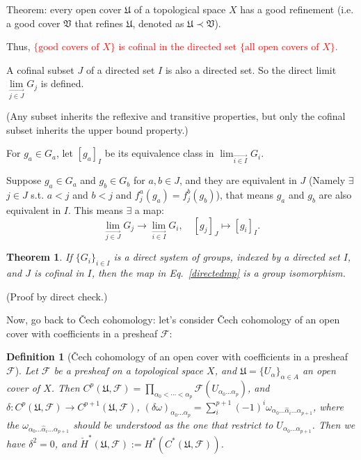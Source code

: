 \documentclass{article}
\theoremstyle{mystyle}
\newtheorem*{definition}{Definition}%
\newtheorem*{theorem*}{Theorem}
\theoremstyle{remark}
\numberwithin{equation}{section}
\begin{document}
Theorem: every open cover $\mathfrak{U}$ of a topological space $X$ has a good refinement (i.e. a good cover $\mathfrak{V}$ that refines $\mathfrak{U}$, denoted as $\mathfrak{U}\prec \mathfrak{V}$).

Thus, \textcolor{red}{$\{\text{good covers of }X\}$ is cofinal in the directed set $\{\text{all open covers of }X\}$.}

A cofinal subset $J$ of a directed set $I$ is also a directed set. So the direct limit $\lim\limits_{\stackrel{\longrightarrow}{j\in J}} G_j$ is defined.

(Any subset inherits the reflexive and transitive properties, but only the cofinal subset inherits the upper bound property.)

For $g_a \in G_a$, let $[g_a]_I$ be its equivalence class in $\lim_{\stackrel{\longrightarrow}{i\in I}} G_i$.

Suppose $g_a \in G_a$ and $g_b \in G_b$ for $a,b\in J$, and they are equivalent in $J$ (Namely $\exists$ $j \in J$ s.t. $a<j$ and $b<j$ and $f^a_j(g_a)=f^b_j(g_b)$), that means $g_a$ and $g_b$ are also equivalent in $I$. This means $\exists$ a map:  
\begin{equation}\label{directedmp}
\lim_{\stackrel{\longrightarrow}{j\in J}} G_j\rightarrow \lim_{\stackrel{\longrightarrow}{i\in I}} G_i,\quad  [g_j]_J\mapsto [g_i]_I.
\end{equation}

\begin{theorem*} If $\{G_i\}_{i\in I}$ is a direct system of groups, indexed by a directed set $I$, and $J$ is cofinal in $I$, then the map in  Eq.~\eqref{directedmp} is a group isomorphism.
\end{theorem*}
(Proof by direct check.)

Now, go back to Čech cohomology: let's consider Čech cohomology of an open cover with coefficients in a presheaf $\mathcal{F}$:

\begin{definition}[Čech cohomology of an open cover with coefficients in a presheaf $\mathcal{F}$] Let $\mathcal{F}$ be a presheaf on a topological space $X$, and $\mathfrak{U} = \{U_\alpha\}_{\alpha \in A}$ an open cover of $X$. Then $C^p(\mathfrak{U},\mathcal{F})
=\prod_{\alpha_0<\cdots <\alpha_p}
\mathcal{F}(U_{\alpha_0...\alpha_p})$, and $\delta\colon C^p(\mathfrak{U},\mathcal{F})\rightarrow  C^{p+1}(\mathfrak{U},\mathcal{F})$, 
$(\delta\omega)_{\alpha_0...\alpha_p} = \sum_i^{p+1} (-1)^i \omega_{\alpha_0...\hat{\alpha}_i...\alpha_{p+1}}$, where the $\omega_{\alpha_0...\hat{\alpha}_i...\alpha_{p+1}}$ should be understood as the one that restrict to $U_{\alpha_0...\alpha_{p+1}}$. Then we have $\delta^2=0$, and $\check{H}^*(\mathfrak{U},\mathcal{F}) :=H^*\left(C^*(\mathfrak{U},\mathcal{F})\right)$. 
\end{definition}
\end{document}

